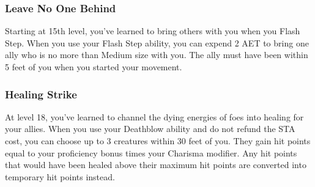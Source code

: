 \subsubsection{Leave No One Behind}
Starting at 15th level, you've learned to bring others with you when you Flash Step. When you use your Flash Step ability, you can expend 2 AET to bring one ally who is no more than Medium size with you. The ally must have been within 5 feet of you when you started your movement.

\subsubsection{Healing Strike}
At level 18, you've learned to channel the dying energies of foes into healing for your allies. When you use your Deathblow ability and do not refund the STA cost, you can choose up to 3 creatures within 30 feet of you. They gain hit points equal to your proficiency bonus times your Charisma modifier. Any hit points that would have been healed above their maximum hit points are converted into temporary hit points instead.